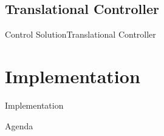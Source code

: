 \subsection{Translational Controller}
\begin{frame}{Control Solution}{Translational Controller}
    
\end{frame}

\section{Implementation}
\begin{frame}{Implementation}{}
\end{frame}

\begin{frame}{Agenda}{}
    \tableofcontents
\end{frame}

